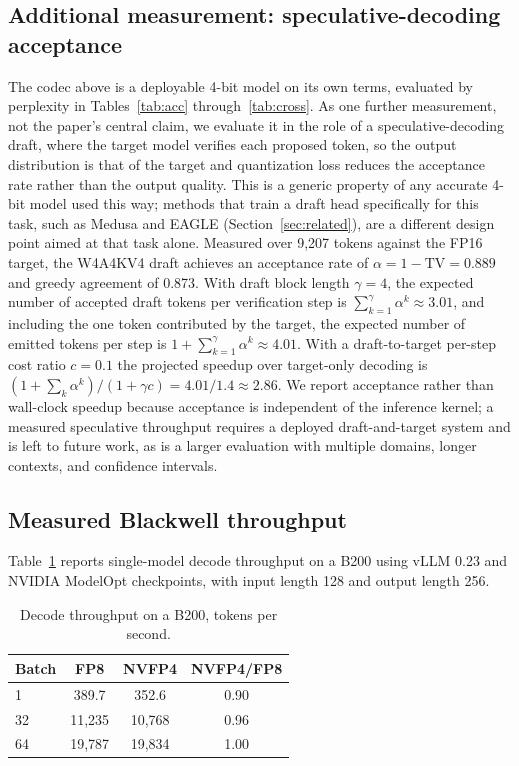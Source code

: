 \documentclass[11pt]{article}
\begin{document}
\subsection{Additional measurement: speculative-decoding acceptance}
The codec above is a deployable 4-bit model on its own terms, evaluated by perplexity
in Tables~\ref{tab:acc} through~\ref{tab:cross}. As one further measurement, not the paper's
central claim, we evaluate it in the role of a speculative-decoding draft, where the
target model verifies each proposed token, so the output distribution is that of the
target and quantization loss reduces the acceptance rate rather than the output
quality. This is a generic property of any accurate 4-bit model used this way; methods
that train a draft head specifically for this task, such as Medusa and EAGLE
(Section~\ref{sec:related}), are a different design point aimed at that task alone.
Measured over 9{,}207 tokens against
the FP16 target, the W4A4KV4 draft achieves an acceptance rate of
$\alpha = 1 - \mathrm{TV} = 0.889$ and greedy agreement of 0.873. With draft block
length $\gamma=4$, the expected number of accepted draft tokens per verification step is
$\sum_{k=1}^{\gamma}\alpha^k \approx 3.01$, and including the one token contributed by
the target, the expected number of emitted tokens per step is
$1+\sum_{k=1}^{\gamma}\alpha^k \approx 4.01$. With a draft-to-target per-step cost ratio
$c=0.1$ the projected speedup over target-only decoding is
$(1+\sum_k \alpha^k)/(1+\gamma c) = 4.01/1.4 \approx 2.86$. We report acceptance rather
than wall-clock speedup because acceptance is independent of the inference kernel; a
measured speculative throughput requires a deployed draft-and-target system and is left
to future work, as is a larger evaluation with multiple domains, longer contexts, and
confidence intervals.

\subsection{Measured Blackwell throughput}
Table~\ref{tab:tput} reports single-model decode throughput on a B200 using vLLM 0.23
and NVIDIA ModelOpt checkpoints, with input length 128 and output length 256.

\begin{table}[h]\centering\small
\caption{Decode throughput on a B200, tokens per second.}\label{tab:tput}
\begin{tabular}{lccc}
\toprule
Batch & FP8 & NVFP4 & NVFP4/FP8 \\
\midrule
1  & 389.7 & 352.6 & 0.90 \\
32 & 11{,}235 & 10{,}768 & 0.96 \\
64 & 19{,}787 & 19{,}834 & 1.00 \\
\bottomrule
\end{tabular}
\end{table}
\end{document}
